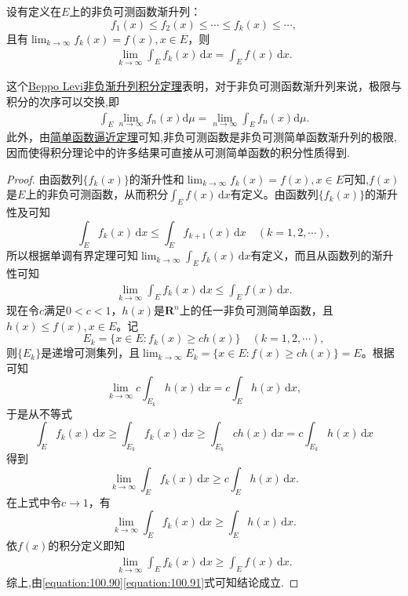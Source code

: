 \documentclass[../../main.tex]{subfiles}
\begin{document}
\begin{theorem}\label{theorem:Beppo Levi非负渐升列积分定理}
设有定义在$E$上的非负可测函数渐升列：
\[
f_1(x) \leqslant f_2(x) \leqslant \cdots \leqslant f_k(x) \leqslant \cdots,
\]
且有$\lim_{k \to \infty} f_k(x) = f(x), x \in E$，则
\begin{align*}
\lim_{k \to \infty} \int_E f_k(x) \, \mathrm{d}x = \int_E f(x) \, \mathrm{d}x. 
\end{align*}
\end{theorem}
\begin{note}
这个\hyperref[theorem:Beppo Levi非负渐升列积分定理]{Beppo Levi非负渐升列积分定理}表明，对于非负可测函数渐升列来说，极限与积分的次序可以交换,即
\begin{align*}
\int_E \lim_{n \to \infty} f_n(x) \mathrm{d}\mu = \lim_{n \to \infty} \int_E f_n(x) \mathrm{d}\mu .
\end{align*}
此外，由\hyperref[theorem:简单函数逼近定理]{简单函数逼近定理}可知,非负可测函数是非负可测简单函数渐升列的极限,因而使得积分理论中的许多结果可直接从可测简单函数的积分性质得到.
\end{note}
\begin{proof}
由函数列$\{f_k(x)\}$的渐升性和$\lim_{k \to \infty} f_k(x) = f(x), x \in E$可知,$f(x)$是$E$上的非负可测函数，从而积分$\int_E f(x) \, \mathrm{d}x$有定义。由函数列$\{f_k(x)\}$的渐升性及可知
\[
\int_E f_k(x) \, \mathrm{d}x \leqslant \int_E f_{k + 1}(x) \, \mathrm{d}x \quad (k = 1,2,\cdots),
\]
所以根据单调有界定理可知$\lim_{k \to \infty} \int_E f_k(x) \, \mathrm{d}x$有定义，而且从函数列的渐升性可知
\begin{align}\label{equation:100.90}
\lim_{k \to \infty} \int_E f_k(x) \, \mathrm{d}x \leqslant \int_E f(x) \, \mathrm{d}x.
\end{align}
现在令$c$满足$0 < c < 1$，$h(x)$是$\mathbf{R}^n$上的任一非负可测简单函数，且$h(x) \leqslant f(x), x \in E$。记
\[
E_k = \{x \in E: f_k(x) \geqslant ch(x)\} \quad (k = 1,2,\cdots),
\]
则$\{E_k\}$是递增可测集列，且$\lim_{k \to \infty} E_k = \{x\in E:f(x)\geqslant ch(x)\}=E$。根据可知
\[
\lim_{k \to \infty} c \int_{E_k} h(x) \, \mathrm{d}x = c \int_E h(x) \, \mathrm{d}x,
\]
于是从不等式
\[
\int_E f_k(x) \, \mathrm{d}x \geqslant \int_{E_k} f_k(x) \, \mathrm{d}x \geqslant \int_{E_k} ch(x) \, \mathrm{d}x = c \int_{E_k} h(x) \, \mathrm{d}x
\]
得到
\[
\lim_{k \to \infty} \int_E f_k(x) \, \mathrm{d}x \geqslant c \int_E h(x) \, \mathrm{d}x.
\]
在上式中令$c \to 1$，有
\[
\lim_{k \to \infty} \int_E f_k(x) \, \mathrm{d}x \geqslant \int_E h(x) \, \mathrm{d}x.
\]
依$f(x)$的积分定义即知
\begin{align}\label{equation:100.91}
\lim_{k \to \infty} \int_E f_k(x) \, \mathrm{d}x \geqslant \int_E f(x) \, \mathrm{d}x.
\end{align}
综上,由\eqref{equation:100.90}\eqref{equation:100.91}式可知结论成立.

\end{proof}
\end{document}
